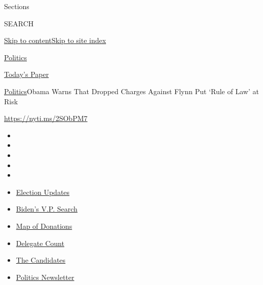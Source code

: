 Sections

SEARCH

\protect\hyperlink{site-content}{Skip to
content}\protect\hyperlink{site-index}{Skip to site index}

\href{https://www.nytimes.com/section/politics}{Politics}

\href{https://myaccount.nytimes.com/auth/login?response_type=cookie\&client_id=vi}{}

\href{https://www.nytimes.com/section/todayspaper}{Today's Paper}

\href{/section/politics}{Politics}\textbar{}Obama Warns That Dropped
Charges Against Flynn Put `Rule of Law' at Risk

\url{https://nyti.ms/2SObPM7}

\begin{itemize}
\item
\item
\item
\item
\item
\end{itemize}

\begin{itemize}
\item
  \href{https://www.nytimes.com/2020/07/31/us/elections/biden-vs-trump.html?action=click\&pgtype=Article\&state=default\&region=TOP_BANNER\&context=storylines_menu}{Election
  Updates}
\item
  \href{https://www.nytimes.com/article/biden-vice-president-2020.html?action=click\&pgtype=Article\&state=default\&region=TOP_BANNER\&context=storylines_menu}{Biden's
  V.P. Search}
\item
  \href{https://www.nytimes.com/interactive/2020/07/24/us/politics/trump-biden-campaign-donors.html?action=click\&pgtype=Article\&state=default\&region=TOP_BANNER\&context=storylines_menu}{Map
  of Donations}
\item
  \href{https://www.nytimes.com/interactive/2020/us/elections/delegate-count-primary-results.html?action=click\&pgtype=Article\&state=default\&region=TOP_BANNER\&context=storylines_menu}{Delegate
  Count}
\item
  \href{https://www.nytimes.com/interactive/2019/us/politics/2020-presidential-candidates.html?action=click\&pgtype=Article\&state=default\&region=TOP_BANNER\&context=storylines_menu}{The
  Candidates}
\item
  \href{https://www.nytimes.com/newsletters/politics?action=click\&pgtype=Article\&state=default\&region=TOP_BANNER\&context=storylines_menu}{Politics
  Newsletter}
\end{itemize}

